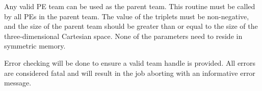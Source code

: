 \begin{apidefinition}
{Any valid \ac{PE} team can be used as the parent team. This routine must be
called by all \acp{PE} in the parent team. The value of the triplets must be
non-negative, and the size of the parent team should be greater than or
equal to the size of the three-dimensional Cartesian space. None of the
parameters need to reside in symmetric memory.

Error checking will be done to ensure a valid team handle is provided.
All errors are considered fatal and will result in the job aborting with
an informative error message.
}


\begin{apiexamples}

\end{apiexamples}

\end{apidefinition}
